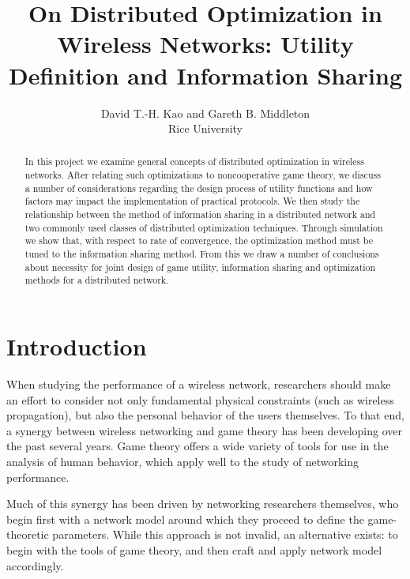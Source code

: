 \documentclass[11pt]{IEEEtran}
\theoremstyle{definition}
\begin{document}
\title{On Distributed Optimization in Wireless Networks: Utility Definition and Information Sharing}

\author{

David T.-H. Kao and Gareth B. Middleton\\
Rice University
}

\maketitle

\begin{abstract}
In this project we examine general concepts of distributed optimization in wireless networks. After relating such optimizations to noncooperative game theory, we discuss a number of considerations regarding the design process of utility functions and how factors may impact the implementation of practical protocols. We then study the relationship between the method of information sharing in a distributed network and two commonly used classes of distributed optimization techniques. Through simulation we show that, with respect to rate of convergence, the optimization method must be tuned to the information sharing method. From this we draw a number of conclusions about necessity for joint design of game utility, information sharing and optimization methods for a distributed network.

\end{abstract}

\section{Introduction}
When studying the performance of a wireless network, researchers should make an effort to consider not only fundamental physical constraints (such as wireless propagation), but also the personal behavior of the users themselves. To that end, a synergy between wireless networking and game theory has been developing over the past several years\cite{LTHCC07,FB04,CLD06}.  Game theory offers a wide variety of tools for use in the analysis of human behavior, which apply well to the study of networking performance.

Much of this synergy has been driven by networking researchers themselves, who begin first with a network model around which they proceed to define the game-theoretic parameters.  While this approach is not invalid, an alternative exists: to begin with the tools of game theory, and then craft and apply network model accordingly.
\end{document}
